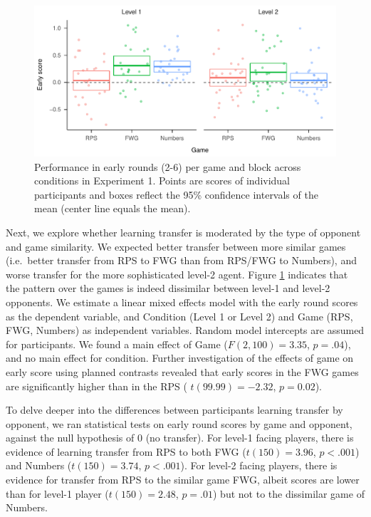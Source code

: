 \documentclass[english,man,floatsintext]{apa6}
\begin{document}
\begin{figure}

{\centering \includegraphics{paper_draft_2021_files/figure-latex/exp1-early-score-by-opp-1} 

}

\caption{\label{ref:figure4-caption}Performance in early rounds (2-6) per game and block across conditions in Experiment 1. Points are scores of individual participants and boxes reflect the 95\% confidence intervals of the mean (center line equals the mean).}\label{fig:exp1-early-score-by-opp}
\end{figure}

Next, we explore whether learning transfer is moderated by the type of opponent and game similarity. We expected better transfer between more similar games (i.e.~better transfer from RPS to FWG than from RPS/FWG to Numbers), and worse transfer for the more sophisticated level-2 agent. Figure \ref{fig:exp1-early-score-by-opp} indicates that the pattern over the games is indeed dissimilar between level-1 and level-2 opponents. We estimate a linear mixed effects model with the early round scores as the dependent variable, and Condition (Level 1 or Level 2) and Game (RPS, FWG, Numbers) as independent variables. Random model intercepts are assumed for participants. We found a main effect of Game (\(F(2,100) = 3.35\), \(p = .04\)), and no main effect for condition. Further investigation of the effects of game on early score using planned contrasts revealed that early scores in the FWG games are significantly higher than in the RPS ( \(t(99.99) = -2.32\), \(p = 0.02\)).

To delve deeper into the differences between participants learning transfer by opponent, we ran statistical tests on early round scores by game and opponent, against the null hypothesis of 0 (no transfer). For level-1 facing players, there is evidence of learning transfer from RPS to both FWG (\(t(150) = 3.96\), \(p < .001\)) and Numbers (\(t(150) = 3.74\), \(p < .001\)). For level-2 facing players, there is evidence for transfer from RPS to the similar game FWG, albeit scores are lower than for level-1 player (\(t(150) = 2.48\), \(p = .01\)) but not to the dissimilar game of Numbers.
\end{document}
